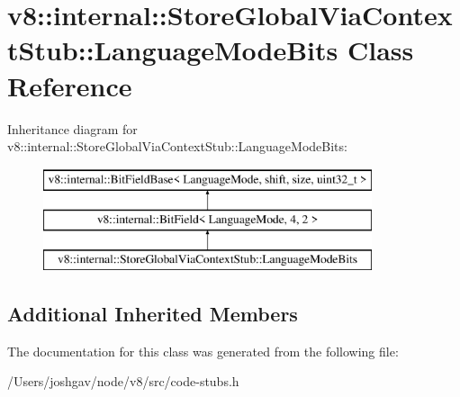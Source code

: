 \hypertarget{classv8_1_1internal_1_1_store_global_via_context_stub_1_1_language_mode_bits}{}\section{v8\+:\+:internal\+:\+:Store\+Global\+Via\+Context\+Stub\+:\+:Language\+Mode\+Bits Class Reference}
\label{classv8_1_1internal_1_1_store_global_via_context_stub_1_1_language_mode_bits}
Inheritance diagram for v8\+:\+:internal\+:\+:Store\+Global\+Via\+Context\+Stub\+:\+:Language\+Mode\+Bits\+:\begin{figure}[H]
\begin{center}
\leavevmode
\includegraphics[height=3.000000cm]{classv8_1_1internal_1_1_store_global_via_context_stub_1_1_language_mode_bits}
\end{center}
\end{figure}
\subsection*{Additional Inherited Members}


The documentation for this class was generated from the following file\+:\begin{DoxyCompactItemize}
\item 
/\+Users/joshgav/node/v8/src/code-\/stubs.\+h\end{DoxyCompactItemize}

